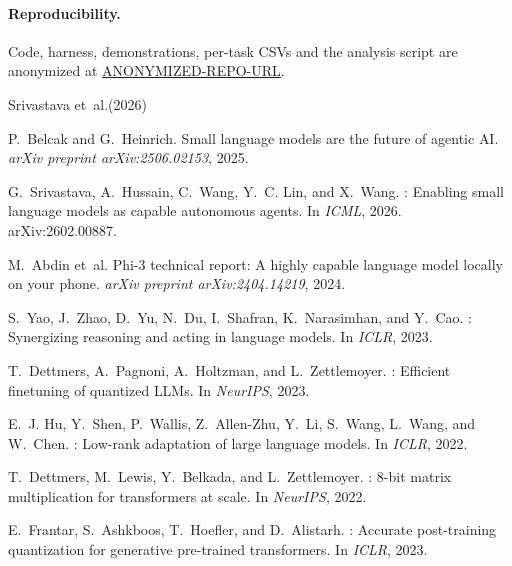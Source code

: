 \documentclass{article}
\begin{document}
\paragraph{Reproducibility.} Code, harness, demonstrations, per-task CSVs and
the analysis script are anonymized at \url{ANONYMIZED-REPO-URL}.




\begin{thebibliography}{Srivastava et~al.(2026)}

P.~Belcak and G.~Heinrich.
\newblock Small language models are the future of agentic {AI}.
\newblock \emph{arXiv preprint arXiv:2506.02153}, 2025.

G.~Srivastava, A.~Hussain, C.~Wang, Y.~C. Lin, and X.~Wang.
: Enabling small language models as capable autonomous
  agents.
\newblock In \emph{ICML}, 2026. arXiv:2602.00887.

M.~Abdin et~al.
\newblock Phi-3 technical report: A highly capable language model locally
  on your phone.
\newblock \emph{arXiv preprint arXiv:2404.14219}, 2024.

S.~Yao, J.~Zhao, D.~Yu, N.~Du, I.~Shafran, K.~Narasimhan, and Y.~Cao.
: Synergizing reasoning and acting in language models.
\newblock In \emph{ICLR}, 2023.

T.~Dettmers, A.~Pagnoni, A.~Holtzman, and L.~Zettlemoyer.
: Efficient finetuning of quantized {LLM}s.
\newblock In \emph{NeurIPS}, 2023.

E.~J. Hu, Y.~Shen, P.~Wallis, Z.~Allen-Zhu, Y.~Li, S.~Wang, L.~Wang, and
  W.~Chen.
: Low-rank adaptation of large language models.
\newblock In \emph{ICLR}, 2022.

T.~Dettmers, M.~Lewis, Y.~Belkada, and L.~Zettlemoyer.
: 8-bit matrix multiplication for transformers at
  scale.
\newblock In \emph{NeurIPS}, 2022.

E.~Frantar, S.~Ashkboos, T.~Hoefler, and D.~Alistarh.
: Accurate post-training quantization for generative
  pre-trained transformers.
\newblock In \emph{ICLR}, 2023.


\end{thebibliography}
\end{document}

